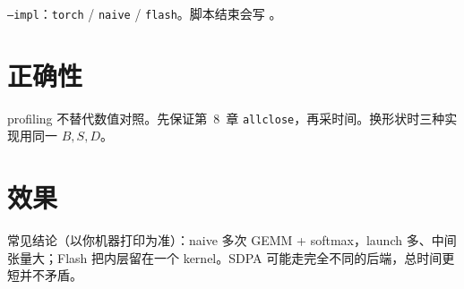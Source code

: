 \texttt{--impl}：\texttt{torch} / \texttt{naive} / \texttt{flash}。脚本结束会写 。

\section{正确性}

\begin{note}
profiling 不替代数值对照。先保证第~8~章 \texttt{allclose}，再采时间。换形状时三种实现用同一 $B,S,D$。
\end{note}

\section{效果}

\begin{remark}
常见结论（以你机器打印为准）：naive 多次 GEMM + softmax，launch 多、中间张量大；Flash 把内层留在一个 kernel。SDPA 可能走完全不同的后端，总时间更短并不矛盾。
\end{remark}
